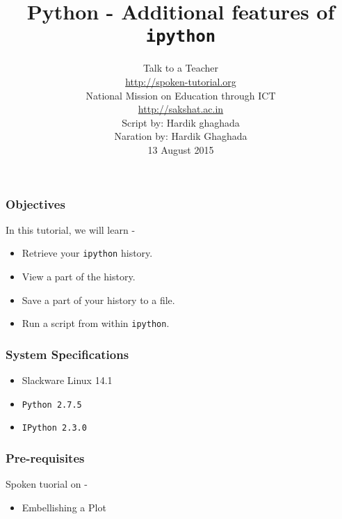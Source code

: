\documentclass[17pt,compress]{beamer}
\author[FOSSEE]{}
\institute[IIT Bombay]{}
\date[]{}
\begin{document}
\sffamily \bfseries
\title
[Additional features of \texttt{ipython}]
{Python - Additional features of \texttt{ipython}}
\author
[FOSSEE, IIT - Bombay]
{\small Talk to a Teacher\\{\color{blue}\url{http://spoken-tutorial.org}}\\National Mission on Education
 through ICT\\{\color{blue}\url{http://sakshat.ac.in}} \\[0.5cm]{\tiny Script by: Hardik ghaghada \\ Naration by: Hardik Ghaghada \\ 13 August 2015}}

\begin{frame}
   \titlepage
\end{frame}
\begin{frame}
\frametitle{Objectives}
\label{sec-2}
In this tutorial, we will learn -\pause
\begin{itemize}
\item Retrieve your \texttt{ipython} history.\pause
\item View a part of the history.\pause
\item Save a part of your history to a file.\pause
\item Run a script from within \texttt{ipython}.
\end{itemize}
\end{frame}
\begin{frame}
\frametitle{System Specifications}\pause
\begin{itemize}
\item Slackware Linux 14.1\pause
\item \texttt{Python 2.7.5} \pause
\item \texttt{IPython 2.3.0}
\end{itemize}
\end{frame}
\begin{frame}
\frametitle{Pre-requisites}
\label{sec-3}
 Spoken tuorial on -
\begin{itemize}
\item Embellishing a Plot
\end{itemize}
\end{frame}
\end{document}
